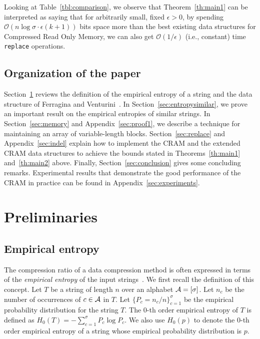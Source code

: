 \documentclass{llncs}
\newcommand{\Order}{\mathcal{O}}
\begin{document}
Looking at Table~\ref{tbl:comparison}, we observe that Theorem~\ref{th:main1}
can be interpreted as saying that for arbitrarily small, fixed
$\epsilon > 0$, by spending $\Order(n \log \sigma \cdot \epsilon(k+1))$ bits
space more than the best existing data structures for
Compressed Read Only Memory, we can also get
$\Order(1/\epsilon)$ (i.e., constant) time \texttt{replace} operations.

\subsection{Organization of the paper}

Section~\ref{sec:preliminaries} reviews the definition of the empirical
entropy of a string and the data structure of Ferragina and
Venturini~\cite{FerVen07b}.
In Section~\ref{sec:entropysimilar}, we prove an important result on
the empirical entropies of similar strings.
In Section~\ref{sec:memory} and Appendix~\ref{sec:proof1}, we describe
a technique for maintaining an array of variable-length blocks.
Section~\ref{sec:replace} and Appendix~\ref{sec:indel} explain how to
implement the CRAM and the extended CRAM data structures to achieve
the bounds stated in Theorems~\ref{th:main1} and~\ref{th:main2} above.
Finally, Section~\ref{sec:conclusion} gives some concluding remarks.
Experimental results that demonstrate the good performance of the CRAM
in practice can be found in Appendix~\ref{sec:experiments}.




\section{Preliminaries}\label{sec:preliminaries}

\subsection{Empirical entropy}\label{sec:entropydef}

The compression ratio of a data compression method is often expressed in
terms of the \emph{empirical entropy} of the input strings~\cite{KosMan99}.
We first recall the definition of this concept.
Let $T$ be a string of length $n$ over an alphabet
${\cal A} = [\sigma]$.
Let $n_c$ be the number of occurrences of $c \in {\cal A}$ in $T$.  
Let $\{P_c = n_c / n\}_{c=1}^\sigma$ be the empirical probability distribution for the string $T$.
The $0$-th order empirical entropy of $T$ is defined as
$H_0(T) = -\sum_{c=1}^\sigma P_c \log P_c.$
We also use $H_0(p)$ to denote the $0$-th order empirical entropy of a string
whose empirical probability distribution is $p$.
\end{document}
